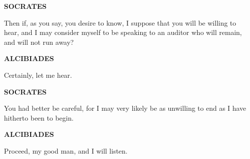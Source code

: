 \documentclass[11pt,letter]{article}
\begin{document}
\par \textbf{SOCRATES}
\par   Then if, as you say, you desire to know, I suppose that you will be willing to hear, and I may consider myself to be speaking to an auditor who will remain, and will not run away?

\par \textbf{ALCIBIADES}
\par   Certainly, let me hear.

\par \textbf{SOCRATES}
\par   You had better be careful, for I may very likely be as unwilling to end as I have hitherto been to begin.

\par \textbf{ALCIBIADES}
\par   Proceed, my good man, and I will listen.
\end{document}
